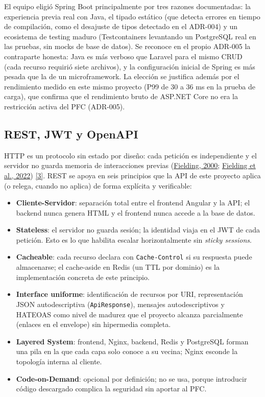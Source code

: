 \documentclass[12pt,a4paper]{article}
\begin{document}
El equipo eligió Spring Boot principalmente por tres razones documentadas: la experiencia
previa real con Java, el tipado estático (que detecta errores en tiempo de compilación,
como el desajuste de tipos detectado en el ADR-004) y un ecosistema de testing maduro
(Testcontainers levantando un PostgreSQL real en las pruebas, sin mocks de base de
datos). Se reconoce en el propio ADR-005 la contraparte honesta: Java es más verboso que
Laravel para el mismo CRUD (cada recurso requirió siete archivos), y la configuración
inicial de Spring es más pesada que la de un microframework. La elección se justifica
además por el rendimiento medido en este mismo proyecto (P99 de 30 a 36 ms en la prueba de
carga), que confirma que el rendimiento bruto de ASP.NET Core no era la restricción activa
del PFC (ADR-005).

\subsection{REST, JWT y OpenAPI}

HTTP es un protocolo sin estado por diseño: cada petición es independiente y el servidor
no guarda memoria de interacciones previas (\hyperlink{ref:fielding2000}{Fielding, 2000}; \hyperlink{ref:fielding2022}{Fielding et al., 2022}) \hyperlink{ieee3}{[3]}. REST
se apoya en seis principios que la API de este proyecto aplica (o relega, cuando no
aplica) de forma explícita y verificable:

\begin{itemize}
  \item \textbf{Cliente-Servidor}: separación total entre el frontend Angular y la API;
        el backend nunca genera HTML y el frontend nunca accede a la base de datos.
  \item \textbf{Stateless}: el servidor no guarda sesión; la identidad viaja en el JWT de
        cada petición. Esto es lo que habilita escalar horizontalmente sin
        \textit{sticky sessions}.
  \item \textbf{Cacheable}: cada recurso declara con \texttt{Cache-Control} si su
        respuesta puede almacenarse; el cache-aside en Redis (un TTL por dominio) es la
        implementación concreta de este principio.
  \item \textbf{Interface uniforme}: identificación de recursos por URI, representación
        JSON autodescriptiva (\texttt{ApiResponse}), mensajes autodescriptivos y HATEOAS
        como nivel de madurez que el proyecto alcanza parcialmente (enlaces en el
        envelope) sin hipermedia completa.
  \item \textbf{Layered System}: frontend, Nginx, backend, Redis y PostgreSQL forman una
        pila en la que cada capa solo conoce a su vecina; Nginx esconde la topología
        interna al cliente.
  \item \textbf{Code-on-Demand}: opcional por definición; no se usa, porque introducir
        código descargado complica la seguridad sin aportar al PFC.
\end{itemize}
\end{document}
